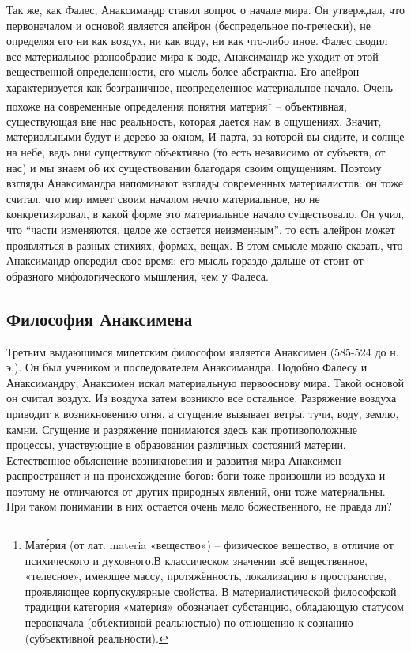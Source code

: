 \documentclass[a4paper, 14pt]{extreport}
\begin{document}
Так же, как Фалес, Анаксимандр ставил вопрос о начале мира. Он
утверждал, что первоначалом и основой является апейрон (беспредельное
по-гречески), не определяя его ни как воздух, ни как воду, ни как
что-либо иное. Фалес сводил все материальное разнообразие мира к воде,
Анаксимандр же уходит от этой вещественной определенности, его мысль
более абстрактна. Его апейрон характеризуется как безграничное,
неопределенное материальное начало. Очень похоже на современные
определения понятия материя\footnote{Мате́рия (от лат. materia
  «вещество») -- физическое вещество, в отличие от психического и
  духовного.В классическом значении всё вещественное, «телесное»,
  имеющее массу, протяжённость, локализацию в пространстве, проявляющее
  корпускулярные свойства. В материалистической философской традиции
  категория «материя» обозначает субстанцию, обладающую статусом
  первоначала (объективной реальностью) по отношению к сознанию
  (субъективной реальности).} -- объективная, существующая вне нас
реальность, которая дается нам в ощущениях. Значит, материальными будут
и дерево за окном, И парта, за которой вы сидите, и солнце на небе, ведь
они существуют объективно (то есть независимо от субъекта, от нас) и мы
знаем об их существо­вании благодаря своим ощущениям. Поэтому взгляды
Анакси­мандра напоминают взгляды современных материалистов: он тоже
считал, что мир имеет своим началом нечто материальное, но не
конкретизировал, в какой форме это материальное начало существовало. Он
учил, что ``части изменяются, целое же остается неизменным'', то есть
алейрон может проявляться в разных стихиях, формах, вещах. В этом смысле
можно сказать, что Анаксимандр опередил свое время: его мысль гораздо
дальше от­ стоит от образного мифологического мышления, чем у Фалеса.

\subsection{Философия Анаксимена}

Третьим выдающимся милетским философом является Анаксимен (585-524 до н.
э.). Он был учеником и последователем Анаксимандра. Подобно Фалесу и
Анаксимандру, Анаксимен искал материальную первооснову мира. Такой
основой он считал воздух. Из воздуха затем возникло все остальное.
Разряжение воздуха приводит к возникновению огня, а сгущение вызывает
ветры, тучи, воду, землю, камни. Сгущение и разряжение понимаются здесь
как противоположные процессы, участвующие в образовании различных
состояний материи. Естественное объяснение возникновения и развития мира
Анаксимен распространяет и на происхождение богов: боги тоже произошли
из воздуха и поэтому не отличаются от других природных явлений, они тоже
материальны. При таком понимании в них остается очень мало
божественного, не правда ли?
\end{document}
